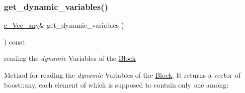 \subsubsection{\texorpdfstring{get\+\_\+dynamic\+\_\+variables()}{get\_dynamic\_variables()}}
{\footnotesize\ttfamily \mbox{\hyperlink{group___s_m_s__types_gaa16aeddc7a50d64299ee0f8d9ca5dc7d}{c\+\_\+\+Vec\+\_\+any}}\& get\+\_\+dynamic\+\_\+variables (\begin{DoxyParamCaption}\item[{void}]{ }\end{DoxyParamCaption}) const\hspace{0.3cm}{\ttfamily [inline]}}



reading the {\itshape dynamic} Variables of the \mbox{\hyperlink{class_s_m_spp__di__unipi__it_1_1_block}{Block}} 

Method for reading the {\itshape dynamic} Variables of the \mbox{\hyperlink{class_s_m_spp__di__unipi__it_1_1_block}{Block}}. It returns a vector of boost\+::any, each element of which is supposed to contain only one among\+:


